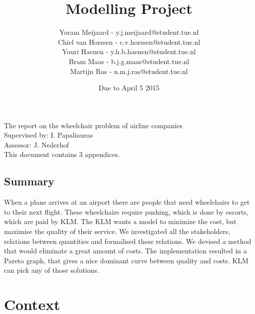\documentclass[a4paper, 11pt, notitlepage]{report}
\title{{\Huge Modelling Project} \vspace{290pt}} %
\author{Yoram Meijaard - y.j.meijaard@student.tue.nl\\Chiel van Horssen - c.v.horssen@student.tue.nl\\Youri Haenen - y.h.b.haenen@student.tue.nl\\Bram Maas - b.j.g.maas@student.tue.nl\\Martijn Ras - n.m.j.ras@student.tue.nl} %
\date{Due to April 5 2015} %
\begin{document}
\maketitle
\begin{center}
The report on the wheelchair problem of airline companies %
\\[12pt]
Supervised by: I. Papaliouras \\ Assessor: J. Nederhof %
\\[12pt]
This document contains 3 appendices.
\end{center}
\thispagestyle{empty}
\newpage


\tableofcontents






\section{Summary}
	When a plane arrives at an airport there are people that need wheelchairs to get to their next flight. These wheelchairs require pushing, which is done by escorts, which are paid by KLM. The KLM wants a model to minimize the cost, but maximise the quality of their service. We investigated all the stakeholders, relations between quantities and formalised these relations. We devised a method that would eliminate a great amount of costs. The implementation resulted in a Pareto graph, that gives a nice dominant curve between quality and costs. KLM can pick any of those solutions.

\setcounter{chapter}{+5}
\chapter{Context}
\end{document}
